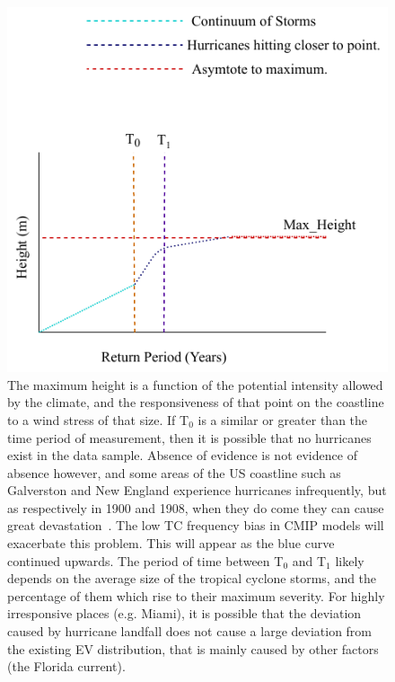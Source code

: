 \begin{figure}[htb!]
    \centering
    \includegraphics[width=1\linewidth]{images/Return_Hypothesis.pdf}
    \vspace{-15pt}
   \caption{The maximum height is a function of the potential intensity
   allowed by the climate, and the responsiveness of that point on the coastline to a
   wind stress of that size. If T$_0$ is a similar or greater than the time period of
   measurement, then it is possible that no hurricanes exist in the data sample.
   Absence of evidence is not evidence of absence however, and some areas of the US
   coastline such as Galverston and New England experience hurricanes infrequently,
   but as respectively in 1900 and 1908, when they do come they can cause great devastation~\cite{emanuel2005divine}.
   The low TC frequency bias in CMIP models will exacerbate this problem. This will
   appear as the blue curve continued upwards. The period of time
   between T$_0$ and T$_1$ likely depends on the average size of the tropical cyclone storms, and the
   percentage of them which rise to their maximum severity.
   For highly irresponsive places (e.g. Miami), it is possible that the deviation caused
   by hurricane landfall does not cause a large deviation from the existing EV distribution,
   that is mainly caused by other factors (the Florida current).
   }
   \label{fig:return_hyp}

\end{figure}
